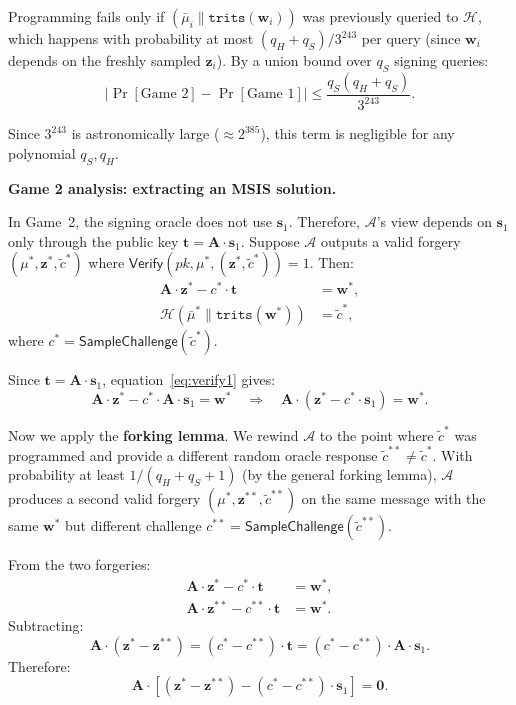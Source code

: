\documentclass[11pt,a4paper]{article}
\theoremstyle{definition}
\newcommand{\Verify}{\textsf{Verify}}
\begin{document}
Programming fails only if $(\bar{\mu}_i \| \texttt{trits}(\mathbf{w}_i))$ was previously queried to $\mathcal{H}$, which happens with probability at most $(q_H + q_S) / 3^{243}$ per query (since $\mathbf{w}_i$ depends on the freshly sampled $\mathbf{z}_i$). By a union bound over $q_S$ signing queries:
\[
  \left| \Pr[\text{Game 2}] - \Pr[\text{Game 1}] \right| \leq \frac{q_S(q_H + q_S)}{3^{243}}.
\]

Since $3^{243}$ is astronomically large ($\approx 2^{385}$), this term is negligible for any polynomial $q_S, q_H$.

\medskip
\noindent\textbf{Game 2 analysis: extracting an MSIS solution.}

In Game~2, the signing oracle does not use $\mathbf{s}_1$. Therefore, $\mathcal{A}$'s view depends on $\mathbf{s}_1$ only through the public key $\mathbf{t} = \mathbf{A} \cdot \mathbf{s}_1$. Suppose $\mathcal{A}$ outputs a valid forgery $(\mu^*, \mathbf{z}^*, \tilde{c}^*)$ where $\Verify(\textit{pk}, \mu^*, (\mathbf{z}^*, \tilde{c}^*)) = 1$. Then:
\begin{align}
  \mathbf{A} \cdot \mathbf{z}^* - c^* \cdot \mathbf{t} &= \mathbf{w}^*, \label{eq:verify1}\\
  \mathcal{H}(\bar{\mu}^* \| \texttt{trits}(\mathbf{w}^*)) &= \tilde{c}^*, \label{eq:verify2}
\end{align}
where $c^* = \textsf{SampleChallenge}(\tilde{c}^*)$.

Since $\mathbf{t} = \mathbf{A} \cdot \mathbf{s}_1$, equation~\eqref{eq:verify1} gives:
\[
  \mathbf{A} \cdot \mathbf{z}^* - c^* \cdot \mathbf{A} \cdot \mathbf{s}_1 = \mathbf{w}^* \quad \Longrightarrow \quad \mathbf{A} \cdot (\mathbf{z}^* - c^* \cdot \mathbf{s}_1) = \mathbf{w}^*.
\]

Now we apply the \textbf{forking lemma}. We rewind $\mathcal{A}$ to the point where $\tilde{c}^*$ was programmed and provide a different random oracle response $\tilde{c}^{**} \neq \tilde{c}^*$. With probability at least $1/(q_H + q_S + 1)$ (by the general forking lemma), $\mathcal{A}$ produces a second valid forgery $(\mu^*, \mathbf{z}^{**}, \tilde{c}^{**})$ on the same message with the same $\mathbf{w}^*$ but different challenge $c^{**} = \textsf{SampleChallenge}(\tilde{c}^{**})$.

From the two forgeries:
\begin{align*}
  \mathbf{A} \cdot \mathbf{z}^* - c^* \cdot \mathbf{t} &= \mathbf{w}^*,\\
  \mathbf{A} \cdot \mathbf{z}^{**} - c^{**} \cdot \mathbf{t} &= \mathbf{w}^*.
\end{align*}
Subtracting:
\[
  \mathbf{A} \cdot (\mathbf{z}^* - \mathbf{z}^{**}) = (c^* - c^{**}) \cdot \mathbf{t} = (c^* - c^{**}) \cdot \mathbf{A} \cdot \mathbf{s}_1.
\]
Therefore:
\[
  \mathbf{A} \cdot \left[ (\mathbf{z}^* - \mathbf{z}^{**}) - (c^* - c^{**}) \cdot \mathbf{s}_1 \right] = \mathbf{0}.
\]
\end{document}
